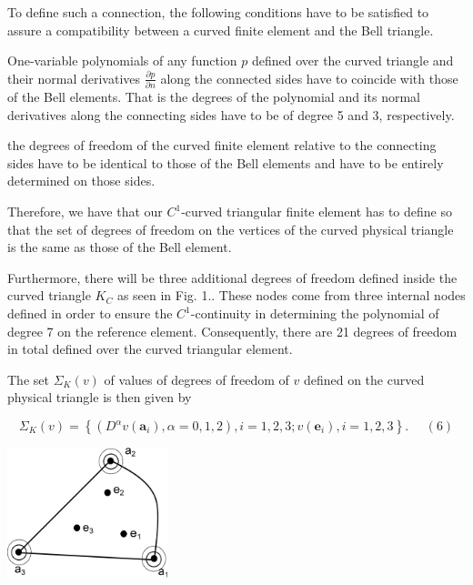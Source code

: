 To define such a connection, the following conditions have to be satisfied to assure a compatibility between a curved finite element and the Bell triangle.


\begin{DoxyItemize}
\item One-\/variable polynomials of any function $ p $ defined over the curved triangle and their normal derivatives $ \frac{\partial p}{\partial n} $ along the connected sides have to coincide with those of the Bell elements. That is the degrees of the polynomial and its normal derivatives along the connecting sides have to be of degree 5 and 3, respectively.
\item the degrees of freedom of the curved finite element relative to the connecting sides have to be identical to those of the Bell elements and have to be entirely determined on those sides.
\end{DoxyItemize}

Therefore, we have that our $ C^1$-\/curved triangular finite element has to define so that the set of degrees of freedom on the vertices of the curved physical triangle is the same as those of the Bell element.

Furthermore, there will be three additional degrees of freedom defined inside the curved triangle $ K_C$ as seen in Fig. 1.. These nodes come from three internal nodes defined in order to ensure the $C^1$-\/continuity in determining the polynomial of degree 7 on the reference element. Consequently, there are 21 degrees of freedom in total defined over the curved triangular element.

The set $\Sigma_{K}(v)$ of values of degrees of freedom of $v$ defined on the curved physical triangle is then given by

\[ \Sigma_{K}(v) = \left\{ (D^{\alpha}v(\mathbf{a}_{i}), \alpha = 0,1,2), i=1,2,3; v(\mathbf{e}_{i}), i = 1,2,3 \right\}. \ \ \ \ \ \ (6)\]

 
\begin{DoxyImage}
\includegraphics[width=0.35\textwidth]{Set_of_dof_curved_element}
\end{DoxyImage}


